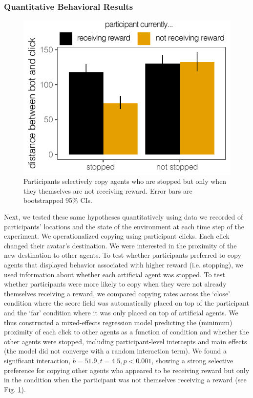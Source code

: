 \documentclass[12pt,letterpaper]{article}
\begin{document}
\subsubsection{Quantitative Behavioral Results}

\begin{figure}
    \centering
    \includegraphics[width=0.8 \linewidth]{figures/proximity.pdf}
        \vspace{-1em}
    \caption{Participants selectively copy agents who are stopped but only when they themselves are not receiving reward. Error bars are bootstrapped 95\% CIs.}
    \label{fig:proximity}
\end{figure}

Next, we tested these same hypotheses quantitatively using data we recorded of participants' locations and the state of the environment at each time step of the experiment.
We operationalized copying using participant clicks.
Each click changed their avatar's destination. 
We were interested in the proximity of the new destination to other agents.
To test whether participants preferred to copy agents that displayed behavior associated with higher reward (i.e. stopping), we used information about whether each artificial agent was stopped.
To test whether participants were more likely to copy when they were not already themselves receiving a reward, we compared copying rates across the `close' condition where the score field was automatically placed on top of the participant and the `far' condition where it was only placed on top of artificial agents.
We thus constructed a mixed-effects regression model predicting the (minimum) proximity of each click to other agents as a function of condition and whether the other agents were stopped, including participant-level intercepts and main effects (the model did not converge with a random interaction term). 
We found a significant interaction, $b = 51.9, t = 4.5, p < 0.001$, showing a strong selective preference for copying other agents who appeared to be receiving reward but only in the condition when the participant was not themselves receiving a reward (see Fig. \ref{fig:proximity}). 
\end{document}
